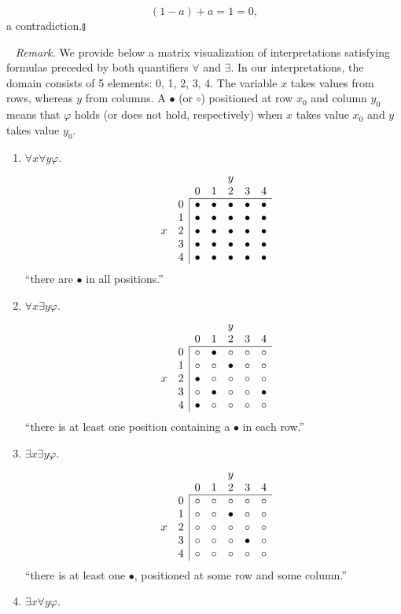 \begin{enumerate}[1.]
\begin{enumerate}[(a)]
\[
(1-a)+a=1=0,
\]
a contradiction.\nolinebreak\hfill$\talloblong$
\end{enumerate}
\ \newline
\textit{Remark.} We provide below a matrix visualization of interpretations satisfying formulas preceded by both quantifiers $\forall$ and $\exists$. In our interpretations, the domain consists of 5 elements: 0, 1, 2, 3, 4. The variable $x$ takes values from rows, whereas $y$ from columns. A $\bullet$ (or $\circ$) positioned at row $x_0$ and column $y_0$ means that $\varphi$ holds (or does not hold, respectively) when $x$ takes value $x_0$ and $y$ takes value $y_0$.
\begin{enumerate}
\item $\forall x \forall y \varphi$.
\[
\begin{array}{cc|ccccc}
\multicolumn{4}{c}{\ } & y & \ & \ \cr
\multicolumn{2}{c}{\ } & 0 & 1 & 2 & 3 & 4 \cr\cline{3-7}
\ & 0 & \bullet & \bullet & \bullet & \bullet & \bullet \cr
\ & 1 & \bullet & \bullet & \bullet & \bullet & \bullet \cr
x & 2 & \bullet & \bullet & \bullet & \bullet & \bullet \cr
\ & 3 & \bullet & \bullet & \bullet & \bullet & \bullet \cr
\ & 4 & \bullet & \bullet & \bullet & \bullet & \bullet
\end{array}
\]
``there are $\bullet$ in all positions.''
\item $\forall x \exists y \varphi$.
\[
\begin{array}{cc|ccccc}
\multicolumn{4}{c}{\ } & y & \ & \ \cr
\multicolumn{2}{c}{\ } & 0 & 1 & 2 & 3 & 4 \cr\cline{3-7}
\ & 0 & \circ & \bullet & \circ & \circ & \circ \cr
\ & 1 & \circ & \circ & \bullet & \circ & \circ \cr
x & 2 & \bullet & \circ & \circ & \circ & \circ \cr
\ & 3 & \circ & \bullet & \circ & \circ & \bullet \cr
\ & 4 & \bullet & \circ & \circ & \circ & \circ
\end{array}
\]
``there is at least one position containing a $\bullet$ in each row.''
\item $\exists x \exists y \varphi$.
\[
\begin{array}{cc|ccccc}
\multicolumn{4}{c}{\ } & y & \ & \ \cr
\multicolumn{2}{c}{\ } & 0 & 1 & 2 & 3 & 4 \cr\cline{3-7}
\ & 0 & \circ & \circ & \circ & \circ & \circ \cr
\ & 1 & \circ & \circ & \bullet & \circ & \circ \cr
x & 2 & \circ & \circ & \circ & \circ & \circ \cr
\ & 3 & \circ & \circ & \circ & \bullet & \circ \cr
\ & 4 & \circ & \circ & \circ & \circ & \circ
\end{array}
\]
``there is at least one $\bullet$, positioned at some row and some column.''
\item $\exists x \forall y \varphi$.

\end{enumerate}
\end{enumerate}
